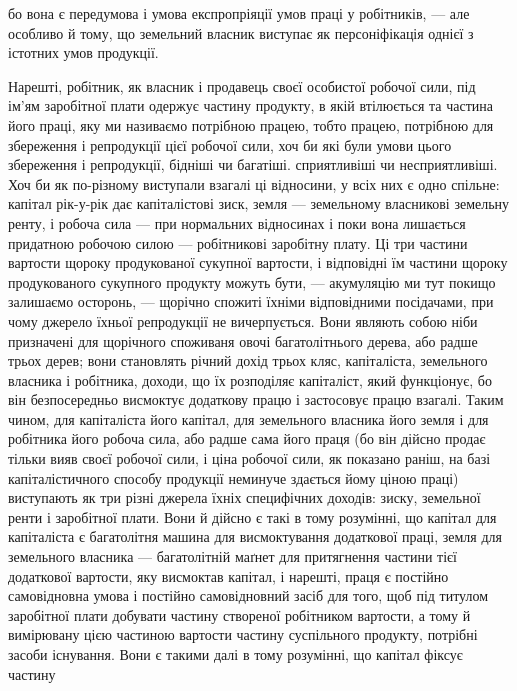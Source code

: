 \parcont{}  %
бо вона є передумова і умова експропріяції умов праці у робітників, — але
особливо й тому, що земельний власник виступає як персоніфікація однієї з
істотних умов продукції.

Нарешті, робітник, як власник і продавець своєї особистої робочої сили,
під ім’ям заробітної плати одержує частину продукту, в якій втілюється та
частина його праці, яку ми називаємо потрібною працею, тобто працею, потрібною
для збереження і репродукції цієї робочої сили, хоч би які були умови
цього збереження і репродукції, бідніші чи багатіші. сприятливіші чи несприятливіші.
Хоч би як по-різному виступали взагалі ці відносини, у всіх них є одно
спільне: капітал рік-у-рік дає капіталістові зиск, земля — земельному власникові
земельну ренту, і робоча сила — при нормальних відносинах і поки
вона лишається придатною робочою силою — робітникові заробітну плату.
Ці три частини вартости щороку продукованої сукупної вартости, і відповідні
їм частини щороку продукованого сукупного продукту можуть бути, — акумуляцію
ми тут покищо залишаємо осторонь, — щорічно спожиті їхніми відповідними
посідачами, при чому джерело їхньої репродукції не вичерпується. Вони являють
собою ніби призначені для щорічного споживаня овочі багатолітнього дерева, або
радше трьох дерев; вони становлять річний дохід трьох кляс, капіталіста, земельного
власника і робітника, доходи, що їх розподіляє капіталіст, який функціонує,
бо він безпосередньо висмоктує додаткову працю і застосовує працю взагалі.
Таким чином, для капіталіста його капітал, для земельного власника його земля
і для робітника його робоча сила, або радше сама його праця (бо він дійсно
продає тільки вияв своєї робочої сили, і ціна робочої сили, як показано раніш,
на базі капіталістичного способу продукції неминуче здається йому ціною праці)
виступають як три різні джерела їхніх специфічних доходів: зиску, земельної
ренти і заробітної плати. Вони й дійсно є такі в тому розумінні, що капітал
для капіталіста є багатолітня машина для висмоктування додаткової праці,
земля для земельного власника — багатолітній маґнет для притягнення частини
тієї додаткової вартости, яку висмоктав капітал, і нарешті, праця є постійно
самовідновна умова і постійно самовідновний засіб для того, щоб під титулом
заробітної плати добувати частину створеної робітником вартости, а тому й вимірювану
цією частиною вартости частину суспільного продукту, потрібні засоби
існування. Вони є такими далі в тому розумінні, що капітал фіксує частину
